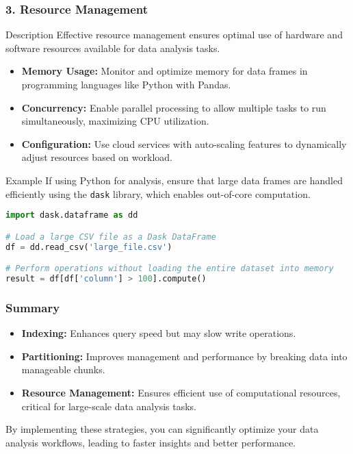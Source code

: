 \documentclass{beamer}
\begin{document}
\begin{frame}[fragile]
    \frametitle{3. Resource Management}
    \begin{block}{Description}
        Effective resource management ensures optimal use of hardware and software resources available for data analysis tasks.
    \end{block}
    
    \begin{itemize}
        \item \textbf{Memory Usage:} Monitor and optimize memory for data frames in programming languages like Python with Pandas.
        \item \textbf{Concurrency:} Enable parallel processing to allow multiple tasks to run simultaneously, maximizing CPU utilization.
        \item \textbf{Configuration:} Use cloud services with auto-scaling features to dynamically adjust resources based on workload.
    \end{itemize}
    
    \begin{block}{Example}
        If using Python for analysis, ensure that large data frames are handled efficiently using the \texttt{dask} library, which enables out-of-core computation.
    \end{block}

    \begin{lstlisting}[language=Python]
import dask.dataframe as dd

# Load a large CSV file as a Dask DataFrame
df = dd.read_csv('large_file.csv')

# Perform operations without loading the entire dataset into memory
result = df[df['column'] > 100].compute()
    \end{lstlisting}
\end{frame}

\begin{frame}[fragile]
    \frametitle{Summary}
    \begin{itemize}
        \item \textbf{Indexing:} Enhances query speed but may slow write operations.
        \item \textbf{Partitioning:} Improves management and performance by breaking data into manageable chunks.
        \item \textbf{Resource Management:} Ensures efficient use of computational resources, critical for large-scale data analysis tasks.
    \end{itemize}
    
    By implementing these strategies, you can significantly optimize your data analysis workflows, leading to faster insights and better performance.
\end{frame}
\end{document}
